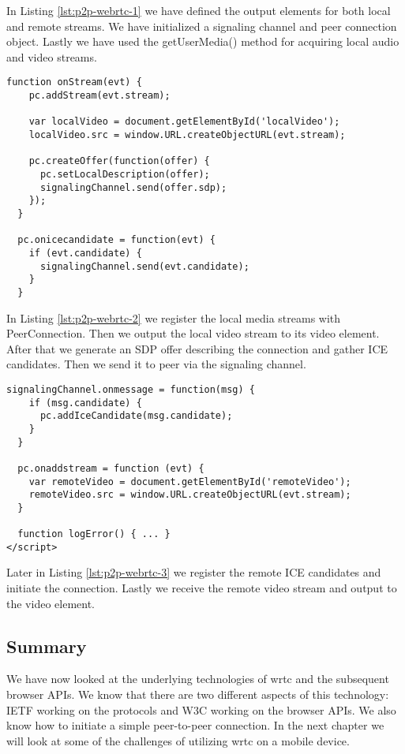 In Listing \ref{lst:p2p-webrtc-1} we have defined the output elements for both local and remote streams. We have initialized a signaling channel and peer connection object. Lastly we have used the getUserMedia() method for acquiring local audio and video streams.

\begin{lstlisting}[caption={Initializing a WebRTC P2P connection, Part II}, label={lst:p2p-webrtc-2}]
  function onStream(evt) {
    pc.addStream(evt.stream);

    var localVideo = document.getElementById('localVideo');
    localVideo.src = window.URL.createObjectURL(evt.stream);

    pc.createOffer(function(offer) {
      pc.setLocalDescription(offer);
      signalingChannel.send(offer.sdp);
    });
  }

  pc.onicecandidate = function(evt) {
    if (evt.candidate) {
      signalingChannel.send(evt.candidate);
    }
  }
\end{lstlisting}

In Listing \ref{lst:p2p-webrtc-2} we register the local media streams with PeerConnection. Then we output the local video stream to its video element. After that we generate an SDP offer describing the connection and gather ICE candidates. Then we send it to peer via the signaling channel.

\begin{lstlisting}[caption={Initializing a WebRTC P2P connection, Part III}, label={lst:p2p-webrtc-3}]
  signalingChannel.onmessage = function(msg) {
    if (msg.candidate) {
      pc.addIceCandidate(msg.candidate);
    }
  }

  pc.onaddstream = function (evt) {
    var remoteVideo = document.getElementById('remoteVideo');
    remoteVideo.src = window.URL.createObjectURL(evt.stream);
  }

  function logError() { ... }
</script>
\end{lstlisting}

Later in Listing \ref{lst:p2p-webrtc-3} we register the remote ICE candidates and initiate the connection. Lastly we receive the remote video stream and output to the video element.

\subsection{Summary}
We have now looked at the underlying technologies of \gls{wrtc} and the subsequent browser APIs. We know that there are two different aspects of this technology: IETF working on the protocols and W3C working on the browser APIs. We also know how to initiate a simple peer-to-peer connection. In the next chapter we will look at some of the challenges of utilizing \gls{wrtc} on a mobile device.